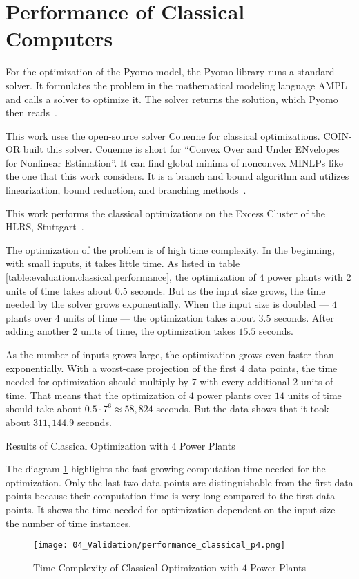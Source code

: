\section{Performance of Classical Computers}

For the optimization of the Pyomo model, the Pyomo library runs a standard solver.
It formulates the problem in the mathematical modeling language AMPL
and calls a solver to optimize it.
The solver returns the solution, which Pyomo then reads~\cite{PyomoAMPL}.

This work uses the open-source solver Couenne for classical optimizations.
COIN-OR built this solver.
Couenne is short for ``Convex Over and Under ENvelopes for Nonlinear Estimation''.
It can find global minima of nonconvex MINLPs like the one that this work considers.
It is a branch and bound algorithm and utilizes linearization, bound reduction, and branching methods~\cite{Belotti2009, CoinorHome, CouenneRepo}.

This work performs the classical optimizations on the Excess Cluster of the HLRS, Stuttgart~\cite{ExcessHLRS, HLRS}.

The optimization of the problem is of high time complexity.
In the beginning, with small inputs, it takes little time.
As listed in table \ref{table:evaluation.classical.performance}, the optimization of $4$ power plants with $2$ units of time takes about $0.5$ seconds.
But as the input size grows, the time needed by the solver grows exponentially.
When the input size is doubled --- $4$ plants over $4$ units of time --- the optimization takes about $3.5$ seconds.
After adding another $2$ units of time, the optimization takes $15.5$ seconds.

As the number of inputs grows large, the optimization grows even faster than exponentially.
With a worst-case projection of the first $4$ data points, the time needed for optimization should multiply by $7$ with every additional $2$ units of time.
That means that the optimization of $4$ power plants over $14$ units of time should take about $0.5 \cdot 7^6 \approx 58,824$ seconds.
But the data shows that it took about $311,144.9$ seconds.

\begin{table}[ht]
  \centering
  
  \caption{Results of Classical Optimization with $4$ Power Plants}
  \label{table:evaluation.classical.performance}
\end{table}

The diagram \ref{figure:evaluation.classical.performance} highlights the fast growing computation time needed for the optimization.
Only the last two data points are distinguishable from the first data points because their computation time is very long compared to the first data points.
It shows the time needed for optimization dependent on the input size --- the number of time instances.

\begin{figure}[ht]
  \centering
  \texttt{[image: 04\_Validation/performance\_classical\_p4.png]}
  \caption{Time Complexity of Classical Optimization with $4$ Power Plants}
  \label{figure:evaluation.classical.performance}
\end{figure}
